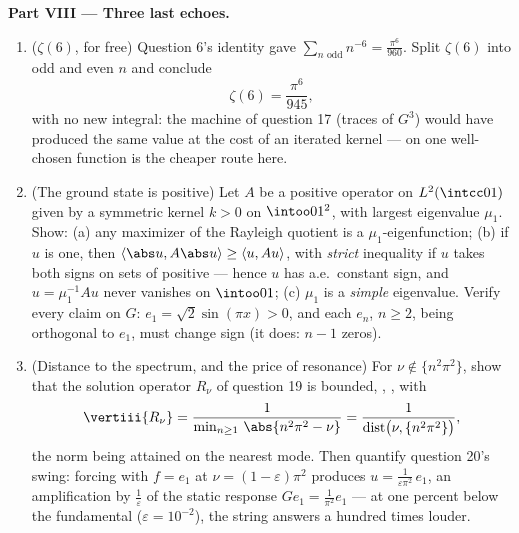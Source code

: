\begin{problem}
\medskip
\noindent\textbf{Part VIII --- Three last echoes.}
\begin{enumerate}[resume]
  \item ($\zeta(6)$, for free) Question 6's 
        identity gave $\sum_{n\text{ odd}}n^{-6} =
        \frac{\pi^6}{960}$. Split $\zeta(6)$ into odd and
        even $n$ and conclude
        \[
        \zeta(6) = \frac{\pi^6}{945},
        \]
        with no new integral: the machine of question 17
        (traces of $G^3$) would have produced the same value
        at the cost of an iterated kernel ---  on one
        well-chosen function is the cheaper route here.
  \item (The ground state is positive) Let $A$ be a 
         positive operator on $L^2(\intcc01)$
        given by a  symmetric kernel $k > 0$ on
        $\intoo01^2$, with largest eigenvalue $\mu_1$. Show:
        (a) any maximizer of the Rayleigh quotient is a
        $\mu_1$-eigenfunction; (b) if $u$ is one, then
        $\langle\abs u, A\abs u\rangle \geq \langle u,
        Au\rangle$, with \emph{strict} inequality if $u$ takes
        both signs on sets of positive  --- hence $u$
        has a.e.\ constant sign, and $u = \mu_1^{-1}Au$
        never vanishes on $\intoo01$; (c) $\mu_1$ is a
        \emph{simple} eigenvalue. Verify every claim on $G$:
        $e_1 = \sqrt2\sin(\pi x) > 0$, and each $e_n$, $n
        \geq 2$, being orthogonal to $e_1$, must change sign
        (it does: $n - 1$  zeros).
  \item (Distance to the spectrum, and the price of
        resonance) For $\nu \notin \{n^2\pi^2\}$, show that
        the solution operator $R_\nu$ of question 19 is
        bounded, , , with
        \[
        \vertiii{R_\nu} =
        \frac1{\min_{n\geq1}\,\abs{n^2\pi^2 - \nu}}
        = \frac1{\operatorname{dist}\bigl(\nu,
        \{n^2\pi^2\}\bigr)},
        \]
        the norm being attained on the nearest mode. Then
        quantify question 20's swing: forcing with $f = e_1$
        at $\nu = (1 - \varepsilon)\pi^2$ produces $u =
        \frac{1}{\varepsilon\pi^2}\,e_1$, an amplification by
        $\frac1\varepsilon$ of the static response $Ge_1 =
        \frac1{\pi^2}e_1$ --- at one percent below the
        fundamental ($\varepsilon = 10^{-2}$), the string
        answers a hundred times louder.
\end{enumerate}
\end{problem}
